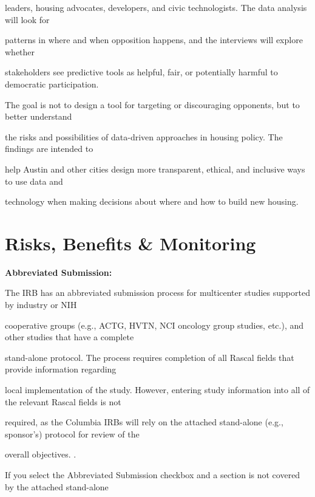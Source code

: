 \documentclass[10pt, letterpaper]{article}
\begin{document}
leaders, housing advocates, developers, and civic technologists. The data analysis will look for

patterns in where and when opposition happens, and the interviews will explore whether

stakeholders see predictive tools as helpful, fair, or potentially harmful to democratic participation.

The goal is not to design a tool for targeting or discouraging opponents, but to better understand

the risks and possibilities of data-driven approaches in housing policy. The findings are intended to

help Austin and other cities design more transparent, ethical, and inclusive ways to use data and

technology when making decisions about where and how to build new housing.

\vspace{0.5em}

\vspace{0.5em}

\vspace{0.5em}

\section*{Risks, Benefits \& Monitoring}

\vspace{0.5em}

\noindent \textbf{Abbreviated Submission:}

The IRB has an abbreviated submission process for multicenter studies supported by industry or NIH

cooperative groups (e.g., ACTG, HVTN, NCI oncology group studies, etc.), and other studies that have a complete

stand-alone protocol. The process requires completion of all Rascal fields that provide information regarding

local implementation of the study. However, entering study information into all of the relevant Rascal fields is not

required, as the Columbia IRBs will rely on the attached stand-alone (e.g., sponsor's) protocol for review of the

overall objectives. .

If you select the Abbreviated Submission checkbox and a section is not covered by the attached stand-alone
\end{document}
